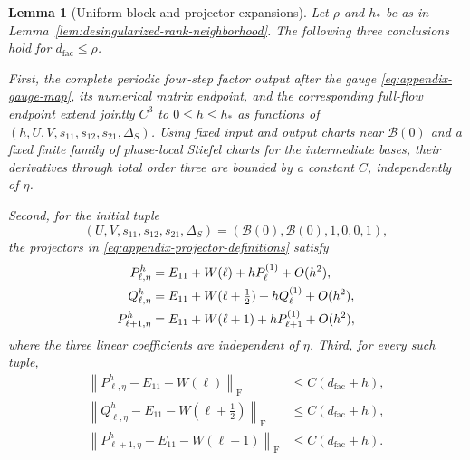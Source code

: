 \documentclass[10pt,a4paper]{amsart}
\numberwithin{equation}{section}
\newtheorem{lemma}[theorem]{Lemma}
\newcommand{\F}{\mathrm F}
\newcommand{\norm}[1]{\left\lVert #1\right\rVert}
\begin{document}
\begin{lemma}[Uniform block and projector expansions]
\label{lem:desingularized-block-map}
Let \(\rho\) and \(h_*\) be as in
Lemma~\ref{lem:desingularized-rank-neighborhood}.  The following three
conclusions hold for \(d_{\mathrm{fac}}\le\rho\).

First, the complete periodic four-step factor output after the gauge
\eqref{eq:appendix-gauge-map}, its numerical matrix endpoint, and the
corresponding full-flow endpoint extend jointly \(C^3\) to
\(0\le h\le h_*\) as functions of
\((h,U,V,s_{11},s_{12},s_{21},\Delta_S)\).  Using fixed input and output
charts near $\mathcal B(0)$ and a fixed finite family of phase-local
Stiefel charts for the intermediate bases, their derivatives through
total order three are bounded by a constant \(C\), independently of
\(\eta\).

Second, for the initial tuple
\begin{equation}\label{eq:appendix-initial-tuple}
 (U,V,s_{11},s_{12},s_{21},\Delta_S)
 =(\mathcal B(0),\mathcal B(0),1,0,0,1),
\end{equation}
the projectors in \eqref{eq:appendix-projector-definitions} satisfy
\begin{align}
 P^{h}_{\ell,\eta}
 &=E_{11}+W(\ell)+hP^{(1)}_\ell+O(h^2),\notag\\
 Q^{h}_{\ell,\eta}
 &=E_{11}+W(\ell+\tfrac12)+hQ^{(1)}_\ell+O(h^2),\notag\\
 P^{h}_{\ell+1,\eta}
 &=E_{11}+W(\ell+1)+hP^{(1)}_{\ell+1}+O(h^2),
 \label{eq:appendix-projector-jets}
\end{align}
where the three linear coefficients are independent of \(\eta\).
Third, for every such tuple,
\begin{equation}\label{eq:appendix-nearby-projectors}
\begin{aligned}
 \norm{P^h_{\ell,\eta}-E_{11}-W(\ell)}_{\F}
 &\le C(d_{\mathrm{fac}}+h),\\
 \norm{Q^h_{\ell,\eta}-E_{11}-W(\ell+\tfrac12)}_{\F}
 &\le C(d_{\mathrm{fac}}+h),\\
 \norm{P^h_{\ell+1,\eta}-E_{11}-W(\ell+1)}_{\F}
 &\le C(d_{\mathrm{fac}}+h).
\end{aligned}
\end{equation}
\end{lemma}
\end{document}
